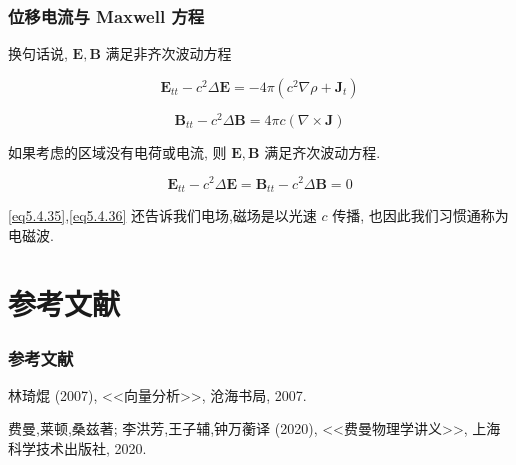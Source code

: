 \documentclass[aspectratio=2516]{beamer}
\begin{document}
\begin{frame}
\frametitle{\kaishu 位移电流与 Maxwell 方程}

\kaishu

\small 

换句话说, $ \boldsymbol{E},\boldsymbol{B} $ 满足非齐次波动方程

\begin{equation}
{\boldsymbol{E}_{tt}} - {c^2}\Delta \boldsymbol{E} =  - 4\pi \left( {{c^2}\nabla \rho  + {\boldsymbol{J}_t}} \right)
\label{eq5.4.35}
\end{equation}

\begin{equation}
{\boldsymbol{B}_{tt}} - {c^2}\Delta \boldsymbol{B} = 4\pi c\left( {\nabla  \times \boldsymbol{J}} \right)
\label{eq5.4.36}
\end{equation}

如果考虑的区域没有电荷或电流, 则 $ \boldsymbol{E},\boldsymbol{B} $ 满足齐次波动方程.

\begin{equation}
{\boldsymbol{E}_{tt}} - {c^2}\Delta \boldsymbol{E} = {\boldsymbol{B}_{tt}} - {c^2}\Delta \boldsymbol{B} = 0
\label{eq5.4.37}
\end{equation}

\ref{eq5.4.35},\ref{eq5.4.36} 还告诉我们电场,磁场是以光速 $ c $ 传播, 也因此我们习惯通称为电磁波.

\end{frame}


\section{\kaishu 参考文献}


\begin{frame}
\frametitle{\kaishu \uppercase\expandafter{} 参考文献}
\footnotesize{
	\begin{thebibliography}{99} %
		 \kaishu 林琦焜 (2007),  \kaishu <<向量分析>>, 沧海书局, 2007.
	\end{thebibliography}

	\vspace{1cm}
	
	\begin{thebibliography}{99} %
		 \kaishu 费曼,莱顿,桑兹著; 李洪芳,王子辅,钟万蘅译 (2020),  \kaishu <<费曼物理学讲义>>, 上海科学技术出版社, 2020.
	\end{thebibliography}
	
}
\end{frame}
\end{document}
